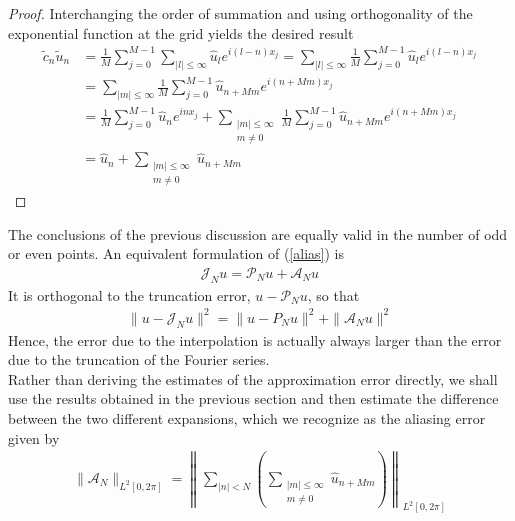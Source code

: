 \begin{proof}
    Interchanging the order of summation and using orthogonality of the exponential function at the grid yields the desired result
    \begin{align*}
    	\widetilde{c}_n \widetilde{u}_n &= \frac{1}{M} \displaystyle \sum_{j=0}^{M - 1} \sum_{|l| \leq \infty} \hat{u}_l e^{i(l -n)x_j} =  \sum_{|l| \leq \infty} \frac{1}{M} \sum_{j=0}^{M - 1} \hat{u}_l e^{i(l -n)x_j} \\
    	&= \sum_{|m| \leq \infty}  \frac{1}{M} \sum_{j=0}^{M - 1} \hat{u}_{n + Mm} e^{i(n + Mm)x_j} \\
    	&= \frac{1}{M} \sum_{j=0}^{M - 1} \hat{u}_n e^{inx_j}
    	+ \sum_{\substack{|m|\leq \infty \\ m \neq 0}} \frac{1}{M} \sum_{j=0}^{M - 1} \hat{u}_{n + Mm} e^{i(n + Mm)x_j} \\
    	&= \hat{u}_n + \sum_{\substack{|m|\leq \infty \\ m \neq 0}} \hat{u}_{n + Mm}
    \end{align*}
	\end{proof}
	
	The conclusions of the previous discussion are equally valid in the number of odd or even points. An equivalent formulation of (\ref{alias}) is
	\begin{align*}
		\mathcal{J}_N u = \mathcal{P}_N u + \mathcal{A}_N u
	\end{align*}
	It is orthogonal to the truncation error, $u - \mathcal{P}_N u$, so that
	\begin{align*}
		\| u - \mathcal{J}_N u \|^2 = \|u - P_N u \|^2 + \| \mathcal{A}_N u \|^2
	\end{align*}
	Hence, the error due to the interpolation is actually always larger than the error due to the truncation of the Fourier series.\\
	
	Rather than deriving the estimates of the approximation error directly, we shall use the results obtained in the previous section and then estimate the difference between the two different expansions, which we recognize as the aliasing error given by
	\begin{align*}
		\| \mathcal{A}_N \|_{L^2 [0, 2\pi]} = \left\| \displaystyle \sum_{|n|<N} \left( \sum_{\substack{|m|\leq \infty \\ m \neq 0}} \hat{u}_{n + Mm}  \right) \right\|_{L^2 [0, 2\pi]}
	\end{align*}
    
